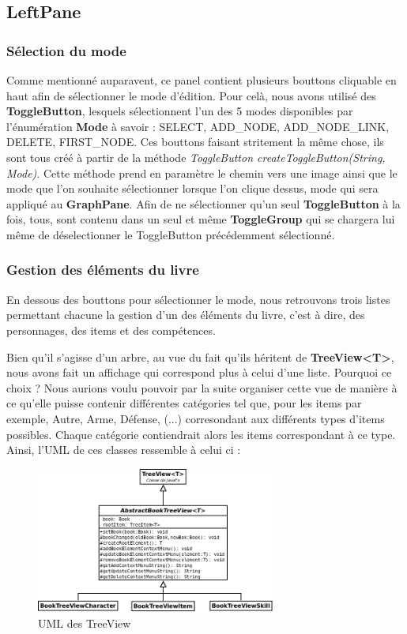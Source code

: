 		\subsection{LeftPane}

			\subsubsection{Sélection du mode}

				Comme mentionné auparavent, ce panel contient plusieurs bouttons cliquable en haut afin de sélectionner le mode d'édition. Pour celà, nous avons utilisé des \textbf{ToggleButton}, lesquels sélectionnent l'un des 5 modes disponibles par l'énumération \textbf{Mode} à savoir : SELECT, ADD\_NODE, ADD\_NODE\_LINK, DELETE, FIRST\_NODE. Ces bouttons faisant stritement la même chose, ils sont tous créé à partir de la méthode \textit{ToggleButton createToggleButton(String, Mode)}. Cette méthode prend en paramètre le chemin vers une image ainsi que le mode que l'on souhaite sélectionner lorsque l'on clique dessus, mode qui sera appliqué au \textbf{GraphPane}. Afin de ne sélectionner qu'un seul \textbf{ToggleButton} à la fois, tous, sont contenu dans un seul et même \textbf{ToggleGroup} qui se chargera lui même de déselectionner le ToggleButton précédemment sélectionné.

			\subsubsection{Gestion des éléments du livre}

				En dessous des bouttons pour sélectionner le mode, nous retrouvons trois listes permettant chacune la gestion d'un des éléments du livre, c'est à dire, des personnages, des items et des compétences.

				Bien qu'il s'agisse d'un arbre, au vue du fait qu'ils héritent de \textbf{TreeView<T>}, nous avons fait un affichage qui correspond plus à celui d'une liste. Pourquoi ce choix ? Nous aurions voulu pouvoir par la suite organiser cette vue de manière à ce qu'elle puisse contenir différentes catégories tel que, pour les items par exemple, Autre, Arme, Défense, (...) corresondant aux différents types d'items possibles. Chaque catégorie contiendrait alors les items correspondant à ce type. Ainsi, l'UML de ces classes ressemble à celui ci :

				\begin{figure}[H]
					\centering\includegraphics[width=0.7\textwidth]{img/fenetreTreeView.png}
					\caption{UML des TreeView}
					\label{fig:fenetreTreeView}
				\end{figure}

